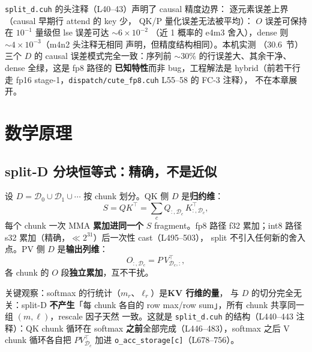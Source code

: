 \texttt{split\_d.cuh} 的头注释（L40--43）声明了 causal 精度边界：
逐元素误差上界（causal 早期行 attend 的 key 少，
QK/P 量化误差无法被平均）：
$O$ 误差可保持在 $10^{-1}$ 量级但 lse 误差可达 $\sim 6\times10^{-2}$
（近 1 概率的 e4m3 舍入），dense 则 $\sim 4\times10^{-3}$（m4n2 头注释无相同
声明，但精度结构相同）。本机实测
（30.6~节）三个 $D$ 的 causal 误差模式完全一致：序列前
$\sim$30\% 的行误差大、其余干净、dense 全绿，这是 fp8 路径的
\textbf{已知特性}而非 bug，工程解法是 hybrid（前若干行走 fp16
stage-1，\texttt{dispatch/cute\_fp8.cuh} L55--58 的 FC-3 注释），
不在本章展开。

\section{数学原理}

\subsection{split-D 分块恒等式：精确，不是近似}\label{sec:30-identity}

设 $D=\mathcal{D}_0\cup\mathcal{D}_1\cup\cdots$ 按 chunk 划分。QK 侧
$D$ 是\textbf{归约维}：
\begin{equation}\label{eq:30-qk-split}
S=QK^{\top}=\sum_{c}Q_{:,\mathcal{D}_c}\,K^{\top}_{:,\mathcal{D}_c},
\end{equation}
每个 chunk 一次 MMA \textbf{累加进同一个} $S$ fragment。fp8 路径 f32
累加；int8 路径 s32 累加（精确，$\ll 2^{31}$）后一次性 cast（L495--503），
split 不引入任何新的舍入点。PV 侧 $D$ 是\textbf{输出列维}：
\begin{equation}\label{eq:30-pv-split}
O_{:,\mathcal{D}_c}=P\,V^{\top}_{\mathcal{D}_c,:},
\end{equation}
各 chunk 的 $O$ 段\textbf{独立累加}，互不干扰。

关键观察：softmax 的行统计（$m_r$、$\ell_r$）是\textbf{KV 行维的量}，
与 $D$ 的切分完全无关：split-D \textbf{不产生}「每 chunk 各自的
row max/row sum」，所有 chunk 共享同一组 $(m,\ell)$，rescale 因子天然
一致。这就是 \texttt{split\_d.cuh} 的结构（L440--443 注释）：QK chunk
循环在 softmax \textbf{之前}全部完成（L446--483），softmax 之后 V
chunk 循环各自把 $P V^{\top}_{\mathcal{D}_c}$ 加进
\texttt{o\_acc\_storage[c]}（L678--756）。

